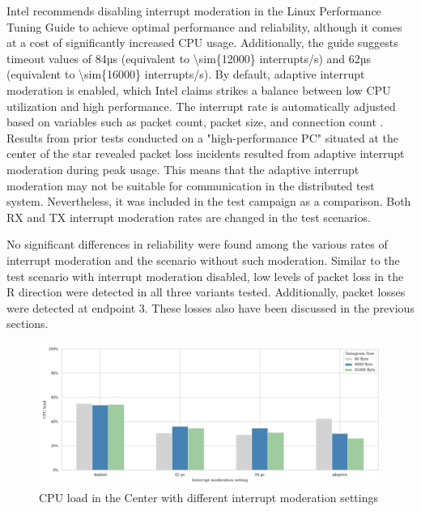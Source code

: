 \documentclass[	a4paper,
				11pt,
				DIV=11,
				bigheadings,
				idxtotoc,
				listof=totoc,	
				bibtotoc,		
				halfparskip,
				cleardoubleempty,
				oneside,
				openright]{scrartcl}
\begin{document}
Intel recommends disabling interrupt moderation in the Linux Performance Tuning Guide \cite{tbd} to achieve optimal performance and reliability, although it comes at a cost of significantly increased CPU usage. Additionally, the guide suggests timeout values of 84µs (equivalent to \num{\sim{12000}} interrupts/s) and 62µs (equivalent to \num{\sim{16000}} interrupts/s). By default, adaptive interrupt moderation is enabled, which Intel claims strikes a balance between low CPU utilization and high performance. The interrupt rate is automatically adjusted based on variables such as packet count, packet size, and connection count \cite{tbd}. Results from prior tests conducted on a "high-performance PC" situated at the center of the star revealed packet loss incidents resulted from adaptive interrupt moderation during peak usage. This means that the adaptive interrupt moderation may not be suitable for communication in the distributed test system. Nevertheless, it was included in the test campaign as a comparison. Both RX and TX interrupt moderation rates are changed in the test scenarios.

No significant differences in reliability were found among the various rates of interrupt moderation and the scenario without such moderation. Similar to the test scenario with interrupt moderation disabled, low levels of packet loss in the R direction were detected in all three variants tested. Additionally, packet losses were detected at endpoint 3. These losses also have been discussed in the previous sections.

\begin{figure}[h]
	\includegraphics[width=\textwidth]{fig10.png}
	\centering
	\caption{CPU load in the Center with different interrupt moderation settings}
    \label{fig:fig10}
\end{figure}
\end{document}

